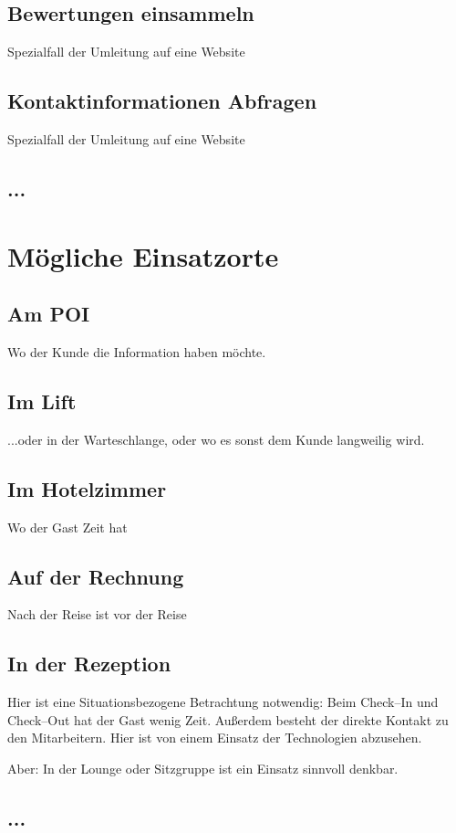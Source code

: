 \subsection{Bewertungen einsammeln}
Spezialfall der Umleitung auf eine Website

\subsection{Kontaktinformationen Abfragen}
Spezialfall der Umleitung auf eine Website

\subsection{...}

\section{Mögliche Einsatzorte}
\label{sec:einsatzorte}

\subsection{Am POI}
Wo der Kunde die Information haben möchte.

\subsection{Im Lift}
...oder in der Warteschlange, oder wo es sonst dem Kunde langweilig wird.

\subsection{Im Hotelzimmer}
Wo der Gast Zeit hat

\subsection{Auf der Rechnung}
Nach der Reise ist vor der Reise

\subsection{In der Rezeption}

Hier ist eine Situationsbezogene Betrachtung notwendig: Beim Check--In und Check--Out hat der Gast wenig Zeit. Außerdem besteht der direkte Kontakt zu den Mitarbeitern. Hier ist von einem Einsatz der Technologien abzusehen.

Aber: In der Lounge oder Sitzgruppe ist ein Einsatz sinnvoll denkbar.

\subsection{...}

